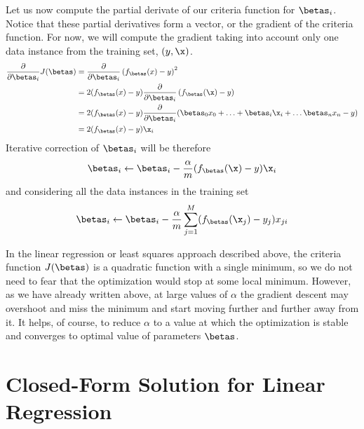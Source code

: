 \begin{refsection}
Let us now compute the partial derivate of our criteria function for $\betas_i$. Notice that these partial derivatives form a vector, or the gradient of the criteria function. For now, we will compute the gradient taking into account only one data instance from the training set, $(y, \x)$. 
%
\begin{align}
{\partial\over\partial\betas_i} J(\betas) & = 
{\partial\over\partial\betas_i} \left(f_{\betas}(x)-y\right)^2 \\
& = 2(f_{\betas}(x)-y){\partial\over\partial\betas_i}\left(f_{\betas}(\x)-y\right) \\
& = 2 (f_{\betas}(x)-y){\partial\over\partial\betas_i}(\betas_0 x_0 + \ldots + \betas_i \x_i + \ldots \betas_n x_n - y) \\
& = 2 (f_{\betas}(x)-y)\x_i
\end{align}
%
Iterative correction of $\betas_i$ will be therefore
\begin{equation}
  \betas_i\leftarrow\betas_i-{\alpha\over m}(f_{\betas}(\x)-y) \x_i
\end{equation}
and considering all the data instances in the training set
\begin{equation}
  \betas_i\leftarrow\betas_i-{\alpha\over m}\sum_{j=1}^M(f_{\betas}(\x_j)-y_j)x_{ji}
\end{equation}

In the linear regression or least squares approach described above, the criteria function $J(\betas)$ is a quadratic function with a single minimum, so we do not need to fear that the optimization would stop at some local minimum. However, as we have already written above, at large values of $\alpha$ the gradient descent may overshoot and miss the minimum and start moving further and further away from it. It helps, of course, to reduce $\alpha$ to a value at which the optimization is stable and converges to optimal value of parameters $\betas$.

\section{Closed-Form Solution for Linear Regression}


\end{refsection}
